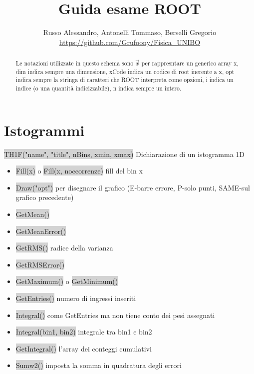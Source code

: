 \documentclass[a4paper]{article}
\begin{document}
	\title{Guida esame ROOT}
	\author{Russo Alessandro, Antonelli Tommaso, Berselli Gregorio\\\url{https://github.com/Grufoony/Fisica_UNIBO}}
    \maketitle
\begin{abstract}
    Le notazioni utilizzate in questo schema sono $\vec{x}$ per rappresntare un generico array x, dim indica sempre una dimensione, xCode indica un codice di root inerente a x, opt indica sempre la stringa di caratteri che ROOT interpreta come opzioni, i indica un indice (o una quantità indicizzabile), n indica sempre un intero.
\end{abstract}
\section{Istogrammi}
    \colorbox{LightGray}{TH1F("name", "title", nBins, xmin, xmax)} Dichiarazione di un istogramma 1D
    \begin{itemize}
        \item \colorbox{LightGray}{Fill(x)} o \colorbox{LightGray}{Fill(x, noccorrenze)} fill del bin x 
        \item \colorbox{LightGray}{Draw("opt")} per disegnare il grafico (E-barre errore, P-solo punti, SAME-sul grafico precedente)
        \item \colorbox{LightGray}{GetMean()}
        \item \colorbox{LightGray}{GetMeanError()}
        \item \colorbox{LightGray}{GetRMS()} radice della varianza
        \item \colorbox{LightGray}{GetRMSError()}
        \item \colorbox{LightGray}{GetMaximum()} o \colorbox{LightGray}{GetMinimum()}
        \item \colorbox{LightGray}{GetEntries()} numero di ingressi inseriti
        \item \colorbox{LightGray}{Integral()} come GetEntries ma non tiene conto dei pesi assegnati
        \item \colorbox{LightGray}{Integral(bin1, bin2)} integrale tra bin1 e bin2
        \item \colorbox{LightGray}{GetIntegral()} l'array dei conteggi cumulativi
        \item \colorbox{LightGray}{Sumw2()} imposta la somma in quadratura degli errori
    \end{itemize}
\end{document}
